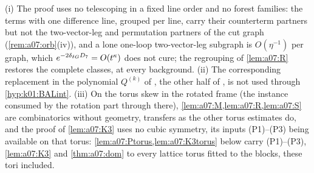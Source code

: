 \begin{remark}\label{rem:a07:dom}
(i) The proof uses no telescoping in a fixed line order and no forest families: the terms with one difference line, grouped per line, carry their counterterm partners but not the two-vector-leg and permutation partners of the cut graph (\cref{rem:a07:orb}(iv)), and a lone one-loop two-vector-leg subgraph is $O(\eta^{-1})$ per graph, which $e^{-2\delta_{\delta G}D_7}=O(t^\kappa)$ does not cure; the regrouping of \cref{lem:a07:R} restores the complete classes, at every background. (ii) The corresponding replacement in the polynomial $Q^{(k)}$ of \cite[p.~579]{Ba2}, the other half of \cite[Prop.~2.6]{Ba2}, is not used through \cref{hyp:k01:BALint}. (iii) On the torus skew in the rotated frame (the instance consumed by the rotation part through \cite[Thm.~3.1]{K1} there), \cref{lem:a07:M,lem:a07:R,lem:a07:S} are combinatorics without geometry, \cite[(1.33)]{Ba3} transfers as the other torus estimates do, and the proof of \cref{lem:a07:K3} uses no cubic symmetry, its inputs (P1)--(P3) being available on that torus: \cref{lem:a07:Ptorus,lem:a07:K3torus} below carry (P1)--(P3), \cref{lem:a07:K3} and \cref{thm:a07:dom} to every lattice torus fitted to the blocks, these tori included.
\end{remark}


